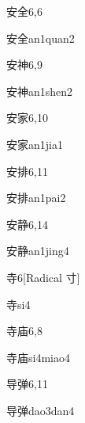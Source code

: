 \begin{entry}{安全}{6,6}
  \begin{phonetics}{安全}{an1quan2}
  \end{phonetics}
\end{entry}

\begin{entry}{安神}{6,9}
  \begin{phonetics}{安神}{an1shen2}
  \end{phonetics}
\end{entry}

\begin{entry}{安家}{6,10}
  \begin{phonetics}{安家}{an1jia1}
  \end{phonetics}
\end{entry}

\begin{entry}{安排}{6,11}
  \begin{phonetics}{安排}{an1pai2}
  \end{phonetics}
\end{entry}

\begin{entry}{安静}{6,14}
  \begin{phonetics}{安静}{an1jing4}
  \end{phonetics}
\end{entry}

\begin{entry}{寺}{6}[Radical 寸]
  \begin{phonetics}{寺}{si4}
  \end{phonetics}
\end{entry}

\begin{entry}{寺庙}{6,8}
  \begin{phonetics}{寺庙}{si4miao4}
  \end{phonetics}
\end{entry}

\begin{entry}{导弹}{6,11}
  \begin{phonetics}{导弹}{dao3dan4}
  \end{phonetics}
\end{entry}

